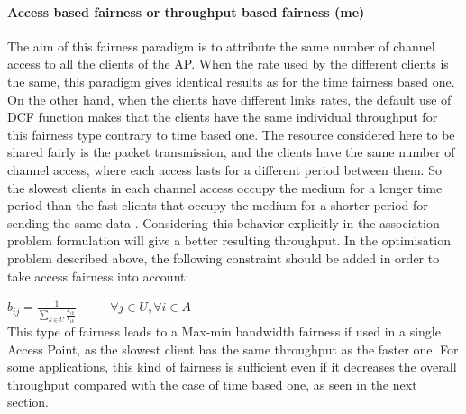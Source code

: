 \documentclass[journal,transmag]{IEEEtran}
\begin{document}
\paragraph{Access based fairness or throughput based fairness (me)}
The aim of this fairness paradigm is to attribute the same number of channel access to all the clients of the AP. When the rate used by the different clients is the same, this paradigm gives identical results as for the time fairness based one. On the other hand, when the clients have different links rates, the default use of DCF function makes that the clients have the same individual throughput for this fairness type contrary to time based one. The resource considered here to be shared fairly is the packet transmission, and the clients have the same number of channel access, where each access lasts for a different period between them. So the slowest clients in each channel access occupy the medium for a longer time period than the fast clients that occupy the medium for a shorter period for sending the same data \cite{08proportional_fairness_multiRate_LAN}. Considering this behavior explicitly in the association problem formulation will give a better resulting throughput. In the optimisation problem described above, the following constraint should be added in order to take access fairness into account:

$ b_{ij}= \frac{1}{\sum\limits_{k \in U} \frac{x_{ik}}{r_{ik}}} $ ~~~~ $\forall j \in U,  \forall i \in A $  \\


This type of fairness leads to a Max-min bandwidth fairness if used in a single Access Point, as the slowest client has the same throughput as the faster one. For some applications, this kind of fairness is sufficient even if it decreases the overall throughput compared with the case of time based one, as seen in the next section. 
\end{document}
